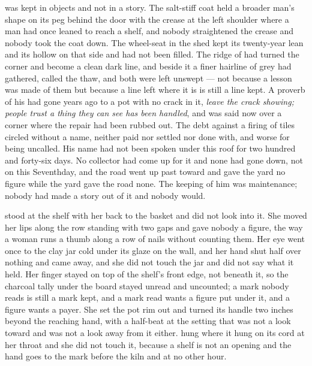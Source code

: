  was kept in objects and not in a story. The salt-stiff coat held a broader man's shape on its peg behind the door with the crease at the left shoulder where a man had once leaned to reach a shelf, and nobody straightened the crease and nobody took the coat down. The wheel-seat in the shed kept its twenty-year lean and its hollow on that side and had not been filled. The ridge of  had turned the corner and become a clean dark line, and beside it a finer hairline of grey had gathered, called the thaw, and both were left unswept --- not because a lesson was made of them but because a line left where it is is still a line kept. A proverb of his had gone years ago to a pot with no crack in it, \emph{leave the crack showing; people trust a thing they can see has been handled}, and was said now over a corner where the repair had been rubbed out. The debt against a firing of tiles circled without a name, neither paid nor settled nor done with, and worse for being uncalled. His name had not been spoken under this roof for two hundred and forty-six days. No collector had come up  for it and none had gone down, not on this Seventhday, and the road went up past  toward  and gave the yard no figure while the yard gave the road none. The keeping of him was maintenance; nobody had made a story out of it and nobody would.

 stood at the shelf with her back to the basket and did not look into it. She moved her lips along the row standing with two gaps and gave nobody a figure, the way a woman runs a thumb along a row of nails without counting them. Her eye went once to the clay jar cold under its glaze on the wall, and her hand shut half over nothing and came away, and she did not touch the jar and did not say what it held. Her finger stayed on top of the shelf's front edge, not beneath it, so the charcoal tally under the board stayed unread and uncounted; a mark nobody reads is still a mark kept, and a mark read wants a figure put under it, and a figure wants a payer. She set the pot rim out and turned its handle two inches beyond the reaching hand, with a half-beat at the setting that was not a look toward  and was not a look away from it either.  hung where it hung on its cord at her throat and she did not touch it, because a shelf is not an opening and the hand goes to the mark before the kiln and at no other hour.

\scenebreak

